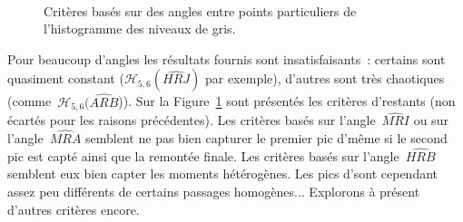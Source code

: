 \documentclass[main.tex]{subfiles}
\begin{document}
\begin{figure}
\ 
\caption{\label{fig:crit_hetero_angle}Critères basés sur des angles entre points particuliers de l'histogramme des niveaux de gris.}
\end{figure}
Pour beaucoup d'angles les résultats fournis sont insatisfaisants~: certains sont quasiment constant ($\mathcal{H}_{5,6}(\widehat{HRJ})$ par exemple), d'autres sont très chaotiques (comme~$\mathcal{H}_{5,6}(\widehat{ARB}$)). Sur la Figure~\ref{fig:crit_hetero_angle} sont présentés les critères d'\hetero restants (\ie non écartés pour les raisons précédentes). 
Les critères basés sur l'angle~$\widehat{MRI}$ ou sur l'angle~$\widehat{MRA}$ semblent ne pas bien capturer le premier pic d'\hetero même si le second pic est capté ainsi que la remontée finale. Les critères basés sur l'angle~$\widehat{HRB}$ semblent eux bien capter les moments hétérogènes. Les pics d'\hetero sont cependant %
assez peu différents de certains passages homogènes... 
Explorons à présent d'autres critères encore.
\end{document}
